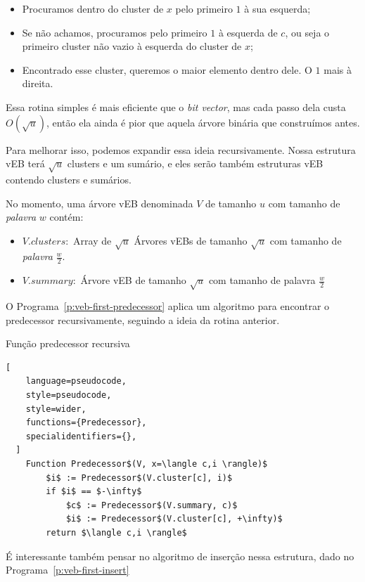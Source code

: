 \begin{itemize}
    \item Procuramos dentro do cluster de $x$ pelo primeiro $1$ à sua esquerda;
    \item Se não achamos, procuramos pelo primeiro $1$ à esquerda de $c$, ou
    seja o primeiro cluster não vazio à esquerda do cluster de $x$; 
    \item Encontrado esse cluster, queremos o maior elemento dentro dele. O $1$
    mais à direita.
\end{itemize}

Essa rotina simples é mais eficiente que o \textit{bit vector}, mas cada passo
dela custa $O(\sqrt{u})$, então ela ainda é pior que aquela árvore binária que
construímos antes. 

Para melhorar isso, podemos expandir essa ideia recursivamente. Nossa estrutura
vEB terá $\sqrt{u}$ clusters e um sumário, e eles serão também estruturas vEB
contendo clusters e sumários.

No momento, uma árvore vEB denominada $V$ de tamanho $u$ com tamanho de
\textit{palavra} $w$ contém:

\begin{itemize}
\item $V.clusters:$ Array de $\sqrt u$ Árvores vEBs de tamanho $\sqrt u$ com
tamanho de \textit{palavra} $\frac{w}{2}$. 
\item $V.summary:$ Árvore vEB de tamanho $\sqrt{u}$ com tamanho de palavra
$\frac{w}{2}$
\end{itemize}

O Programa~\ref{p:veb-first-predecessor} aplica um algoritmo para encontrar o
predecessor recursivamente, seguindo a ideia da rotina anterior.

\begin{programruledcaption}{Função predecessor recursiva\label{p:veb-first-predecessor}}
  \begin{lstlisting}[
    language=pseudocode,
    style=pseudocode,
    style=wider,
    functions={Predecessor},
    specialidentifiers={},
  ]
    Function Predecessor$(V, x=\langle c,i \rangle)$
        $i$ := Predecessor$(V.cluster[c], i)$
        if $i$ == $-\infty$
            $c$ := Predecessor$(V.summary, c)$
            $i$ := Predecessor$(V.cluster[c], +\infty)$
        return $\langle c,i \rangle$
  \end{lstlisting}
\end{programruledcaption}

É interessante também pensar no algoritmo de inserção nessa estrutura, dado no
Programa~\ref{p:veb-first-insert}

